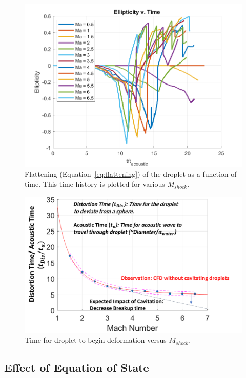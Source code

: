 \documentclass{UCF_ETD}
\begin{document}
\begin{figure}
\centering
\includegraphics[width=\textwidth]{Figures/Ellipticity_v_Ma.png}
\caption{Flattening (Equation~\ref{eq:flattening}) of the droplet as a function of time. This time history is plotted for various $M_{shock}$.}
\label{fig:transientFlattening}
\end{figure}

\begin{figure}
\centering
\includegraphics[width=\textwidth]{Figures/Deformation_time_scale_v_Ma.png}
\caption{Time for droplet to begin deformation versus $M_{shock}$.}
\label{fig:def_time_scale}
\end{figure}




\subsection{Effect of Equation of State}
\end{document}
